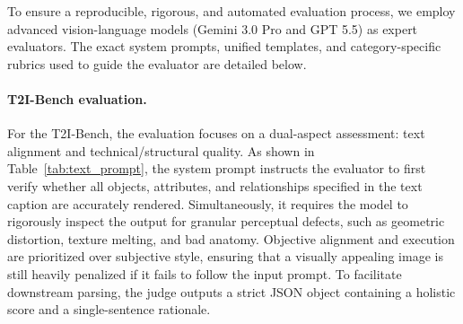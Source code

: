 \documentclass{llmxive}
\providecommand{\arraystretch}{1}
\begin{document}
To ensure a reproducible, rigorous, and automated evaluation process, we employ advanced vision-language models (Gemini 3.0 Pro and GPT 5.5) as expert evaluators. The exact system prompts, unified templates, and category-specific rubrics used to guide the evaluator are detailed below.

\paragraph{T2I-Bench evaluation.} 
For the T2I-Bench, the evaluation focuses on a dual-aspect assessment: text alignment and technical/structural quality. As shown in Table~\ref{tab:text_prompt}, the system prompt instructs the evaluator to first verify whether all objects, attributes, and relationships specified in the text caption are accurately rendered. Simultaneously, it requires the model to rigorously inspect the output for granular perceptual defects, such as geometric distortion, texture melting, and bad anatomy. Objective alignment and execution are prioritized over subjective style, ensuring that a visually appealing image is still heavily penalized if it fails to follow the input prompt. To facilitate downstream parsing, the judge outputs a strict JSON object containing a holistic score and a single-sentence rationale.

\begin{table}[b]
\centering
\renewcommand{\arraystretch}{1}
\caption{System prompt for T2I-Bench evaluation.}
\label{tab:text_prompt}
\end{table}
\end{document}
